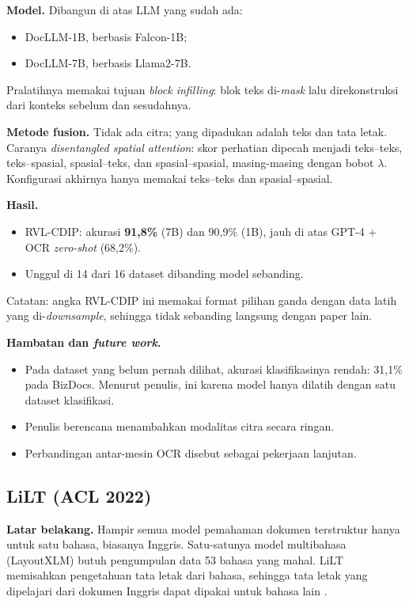 \textbf{Model.} Dibangun di atas LLM yang sudah ada:
\begin{itemize}
  \item DocLLM-1B, berbasis Falcon-1B;
  \item DocLLM-7B, berbasis Llama2-7B.
\end{itemize}
Pralatihnya memakai tujuan \textit{block infilling}: blok teks di-\textit{mask} lalu
direkonstruksi dari konteks sebelum dan sesudahnya.

\textbf{Metode fusion.} Tidak ada citra; yang dipadukan adalah teks dan tata letak.
Caranya \textit{disentangled spatial attention}: skor perhatian dipecah menjadi teks--teks,
teks--spasial, spasial--teks, dan spasial--spasial, masing-masing dengan bobot $\lambda$.
Konfigurasi akhirnya hanya memakai teks--teks dan spasial--spasial.

\textbf{Hasil.}
\begin{itemize}
  \item RVL-CDIP: akurasi \textbf{91,8\%} (7B) dan 90,9\% (1B), jauh di atas GPT-4 +
  OCR \textit{zero-shot} (68,2\%).
  \item Unggul di 14 dari 16 dataset dibanding model sebanding.
\end{itemize}
Catatan: angka RVL-CDIP ini memakai format pilihan ganda dengan data latih yang
di-\textit{downsample}, sehingga tidak sebanding langsung dengan paper lain.

\textbf{Hambatan dan \textit{future work}.}
\begin{itemize}
  \item Pada dataset yang belum pernah dilihat, akurasi klasifikasinya rendah: 31,1\% pada
  BizDocs. Menurut penulis, ini karena model hanya dilatih dengan satu dataset
  klasifikasi.
  \item Penulis berencana menambahkan modalitas citra secara ringan.
  \item Perbandingan antar-mesin OCR disebut sebagai pekerjaan lanjutan.
\end{itemize}

\subsection{LiLT (ACL 2022)}\label{sec:lilt}

\textbf{Latar belakang.} Hampir semua model pemahaman dokumen terstruktur hanya untuk satu
bahasa, biasanya Inggris. Satu-satunya model multibahasa (LayoutXLM) butuh pengumpulan
data 53 bahasa yang mahal. LiLT memisahkan pengetahuan tata letak dari bahasa, sehingga
tata letak yang dipelajari dari dokumen Inggris dapat dipakai untuk bahasa lain
\parencite{wang2022lilt}.

